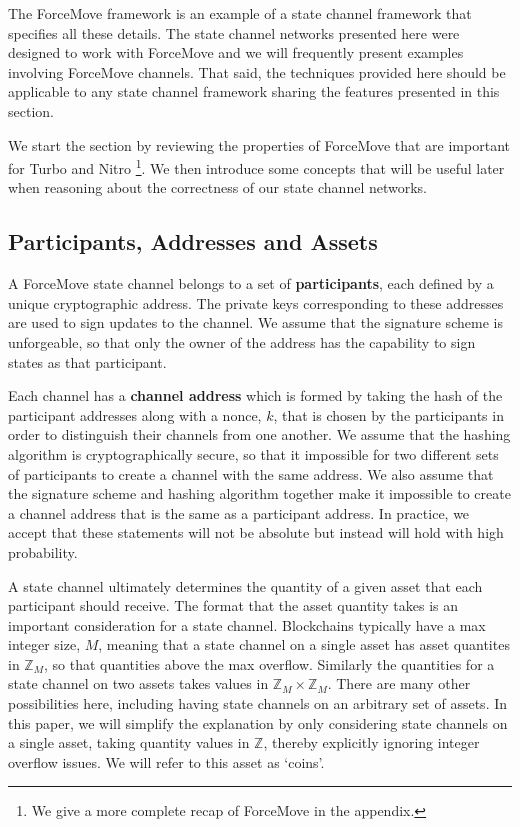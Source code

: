 \documentclass{article}
\begin{document}
The ForceMove framework is an example of a state channel framework that specifies all these details. 
The state channel networks presented here were designed to work with ForceMove and we will frequently present examples involving ForceMove channels.
That said, the techniques provided here should be applicable to any state channel framework sharing the features presented in this section.

We start the section by reviewing the properties of ForceMove that are important for Turbo and Nitro \footnote{We give a more complete recap of ForceMove in the appendix.}. 
We then introduce some concepts that will be useful later when reasoning about the correctness of our state channel networks. 

\subsection{Participants, Addresses and Assets}

A ForceMove state channel belongs to a set of \textbf{participants}, each defined by a unique cryptographic address.
The private keys corresponding to these addresses are used to sign updates to the channel.
We assume that the signature scheme is unforgeable, so that only the owner of the address has the capability to sign states as that participant.

Each channel has a \textbf{channel address} which is formed by taking the hash of the participant addresses along with a nonce, $k$, that is chosen by the participants in order to distinguish their channels from one another.
We assume that the hashing algorithm is cryptographically secure, so that it impossible for two different sets of participants to create a channel with the same address.
We also assume that the signature scheme and hashing algorithm together make it impossible to create a channel address that is the same as a participant address.
In practice, we accept that these statements will not be absolute but instead will hold with high probability.

A state channel ultimately determines the quantity of a given asset that each participant should receive.
The format that the asset quantity takes is an important consideration for a state channel.
Blockchains typically have a max integer size, $M$, meaning that a state channel on a single asset
has asset quantites in $\mathbb{Z}_M$, so that quantities above the max overflow.
Similarly the quantities for a state channel on two assets takes values in $\mathbb{Z}_M \times \mathbb{Z}_M$.
There are many other possibilities here, including having state channels on an arbitrary set of assets.
In this paper, we will simplify the explanation by only considering state channels on a single
asset, taking quantity values in $\mathbb{Z}$, thereby explicitly ignoring integer overflow issues.
We will refer to this asset as `coins'.
\end{document}
